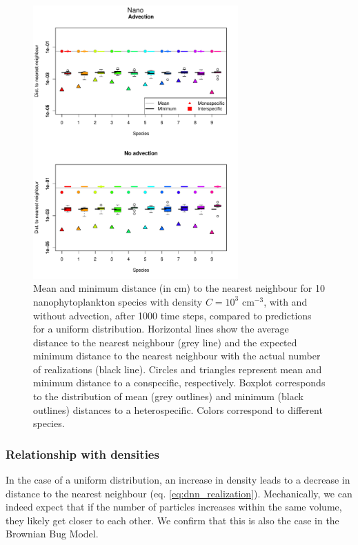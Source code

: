 \documentclass[english]{article}
\begin{document}
\begin{figure}[H]
\begin{centering}
\includegraphics[width=0.7\textwidth]{../code/figure/distrib_distance_nano_box_10sp}
\par\end{centering}
\caption{Mean and minimum distance (in cm) to the nearest neighbour for 10
nanophytoplankton species with density $C=10^{3}$ cm$^{-3}$, with
and without advection, after 1000 time steps, compared to predictions
for a uniform distribution. Horizontal lines show the average distance
to the nearest neighbour (grey line) and the expected minimum distance
to the nearest neighbour with the actual number of realizations (black
line). Circles and triangles represent mean and minimum distance to
a conspecific, respectively. Boxplot corresponds to the distribution
of mean (grey outlines) and minimum (black outlines) distances to
a heterospecific. Colors correspond to different species. \label{fig:Distance_nano}}
\end{figure}


\subsubsection*{Relationship with densities}

In the case of a uniform distribution, an increase in density leads
to a decrease in distance to the nearest neighbour (eq. \ref{eq:dnn_realization}).
Mechanically, we can indeed expect that if the number of particles
increases within the same volume, they likely get closer to each other.
We confirm that this is also the case in the Brownian Bug Model. 
\end{document}
